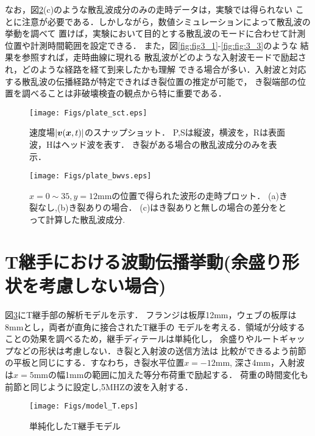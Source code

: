なお，図\ref{fig:fig3_4}(c)のような散乱波成分のみの走時データは，実験では得られない
ことに注意が必要である．しかしながら，数値シミュレーションによって散乱波の挙動を調べて
置けば，実験において目的とする散乱波のモードに合わせて計測位置や計測時間範囲を設定できる．
また，図\ref{fig:fig3_1}-\ref{fig:fig:3_3}のような 結果を参照すれば，走時曲線に現れる
散乱波がどのような入射波モードで励起され，どのような経路を経て到来したかも理解
できる場合が多い．入射波と対応する散乱波の伝播経路が特定できればき裂位置の推定が可能で，
き裂端部の位置を調べることは非破壊検査の観点から特に重要である．
\begin{figure}[h]
	\begin{center}
	\texttt{[image: Figs/plate\_sct.eps]} 
	\end{center}
	\caption{
		速度場$|\mbox{\boldmath $v$}(\mbox{\boldmath $x$},t)|$のスナップショット．
		P,Sは縦波，横波を，Rは表面波，Hはヘッド波を表す．
		き裂がある場合の散乱波成分のみを表示．
	} 
	\label{fig:fig3_3}
\end{figure}
\begin{figure}[h]
	\begin{center}
	\texttt{[image: Figs/plate\_bwvs.eps]} 
	\end{center}
	\caption{
		$x=0\sim35, y=12$mmの位置で得られた波形の走時プロット．
		(a)き裂なし,(b)き裂ありの場合．
		(c)はき裂ありと無しの場合の差分をとって計算した散乱波成分.
	} 
	\label{fig:fig3_4}
\end{figure}
\section{T継手における波動伝播挙動(余盛り形状を考慮しない場合)}
図\ref{fig:fig3_01}にT継手部の解析モデルを示す．
フランジは板厚12mm，ウェブの板厚は8mmとし，両者が直角に接合されたT継手の
モデルを考える．領域が分岐することの効果を調べるため，継手ディテールは単純化し，
余盛りやルートギャップなどの形状は考慮しない．き裂と入射波の送信方法は
比較ができるよう前節の平板と同じにする．すなわち，き裂水平位置$x=-12$mm, 
深さ4mm，入射波は$x=5$mmの幅1mmの範囲に加えた等分布荷重で励起する．
荷重の時間変化も前節と同じように設定し,5MHZの波を入射する．
\begin{figure}[h]
	\begin{center}
	\texttt{[image: Figs/model\_T.eps]} 
	\end{center}
	\caption{
		単純化したT継手モデル
	} 
	\label{fig:fig3_01}
\end{figure}
